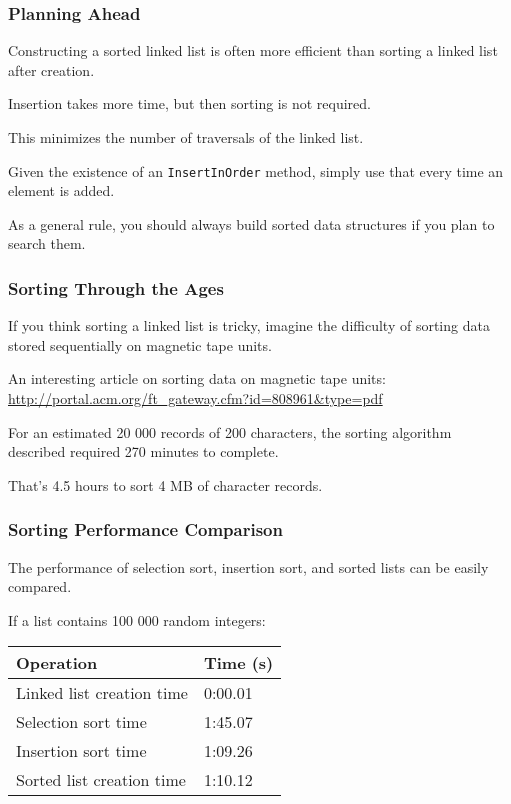 \begin{frame}
\frametitle{Planning Ahead}

Constructing a sorted linked list is often more efficient than sorting a linked list after creation.

Insertion takes more time, but then sorting is not required.

This minimizes the number of traversals of the linked list.

Given the existence of an \texttt{InsertInOrder} method, simply use that every time an element is added.

As a general rule, you should always build sorted data structures if you plan to search them.


\end{frame}


\begin{frame}
\frametitle{Sorting Through the Ages}
If you think sorting a linked list is tricky, imagine the difficulty of sorting data stored sequentially on magnetic tape units.

An interesting article on sorting data on magnetic tape units:
\url{http://portal.acm.org/ft_gateway.cfm?id=808961&type=pdf}
	
For an estimated 20 000 records of 200 characters, the sorting algorithm described required 270 minutes to complete.

That's 4.5 hours to sort 4 MB of character records.
\end{frame}

\begin{frame}
\frametitle{Sorting Performance Comparison}

The performance of selection sort, insertion sort, and sorted lists can be easily compared.

If a list contains 100 000 random integers:
\begin{center}
\begin{tabular}{l|l}
\textbf{Operation} & \textbf{Time (s)}\\ \hline
Linked list creation time & 0:00.01\\ \hline
Selection sort time		& 1:45.07\\ \hline
Insertion sort time		& 1:09.26\\ \hline
Sorted list creation time	& 1:10.12\\
\end{tabular}
\end{center}

\end{frame}

